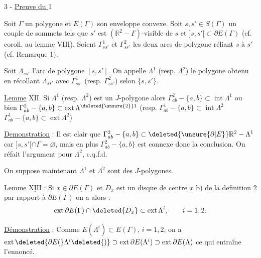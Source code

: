 3 - \uline{Preuve du } 1

\margin{!}Soit $\Gamma$ un polygone et $E(\Gamma)$ son enveloppe convexe. Soit $s,s'\in S(\Gamma)$ un couple de sommets  tels que $s'$ est $(\mathbb{R}^2-\Gamma)$-visible de $s$ et $]s,s'[\subset\partial E(\Gamma)$ (cf. coroll. au lemme $\underline{\overline{\mathrm{VIII}}}$). Soient $\Gamma^1_{ss'}$ et $\Gamma^2_{ss'}$ les deux arcs de polygone  réliant $s$ à $s'$ (cf. Remarque 1).
\margin{$\vert$}

Soit $\Lambda_{ss'}$ l'arc de polygone $[s,s']$. On appelle $\Lambda^1$ (resp. $\Lambda^2$) le polygone obtenu en récollant $\Lambda_{ss'}$ avec $\Gamma^1_{ss'}$ (resp. $\Gamma^2_{ss'}$) selon $\{s,s'\}$.

\uline{Lemme} $\underline{\overline{\mathrm{XII}}}$. Si $\Lambda^1$ (resp. $\Lambda^2$) est un $J$-polygone alors $\Gamma^2_{ab}-\{a,b\}\subset\operatorname{int}\Lambda^1$ ou bien $\Gamma^2_{ab}-\{a,b\}\subset\operatorname{ext}\Lambda^{\deleted{\unsure{2}}1}$ (resp. $\Gamma^1_{ab}-\{a,b\}\subset\operatorname{int}\Lambda^2$ $\Gamma^1_{ab}-\{a,b\}\subset\operatorname{ext}\Lambda^2$)

\uline{Demonstration} : Il est clair que $\Gamma^2_{ab}-\{a,b\}\subset\deleted{\unsure{\partial|E}}\mathbb{R}^2-\Lambda^1$ car $]s,s'[\cap\Gamma=\varnothing$, mais en plus $\Gamma^2_{ab}-\{a,b\}$ est connexe donc la conclusion. On réfait l'argument pour $\Lambda^2$, c.q.f.d.
\margin{$\vert$}\margin{$\vert$}

On suppose maintenant  $\Lambda^1$ et $\Lambda^2$  sont des $J$-polygones.

\uline{Lemme} $\underline{\overline{\mathrm{XIII}}}$ : Si $x\in\partial E(\Gamma)$ et $D_x$ est un disque de centre $x$  b) de la definition 2 par rapport à $\partial E(\Gamma)$ on a alors :
\[
\operatorname{ext}\partial E(\Gamma)\cap\deleted{D_x}\subset\operatorname{ext}\Lambda^i,\qquad i=1,2.
\]

\uline{Démonstration} : Comme $E(\Lambda^i)\subset E(\Gamma)$, $i=1,2$, on a $\operatorname{ext}\deleted{\partial E(}\Lambda^i\deleted{)}\supset\operatorname{ext}\partial E(\Lambda^i)\supset\operatorname{ext}\partial E(\Lambda)$ ce qui entraîne l'ennoncé.
